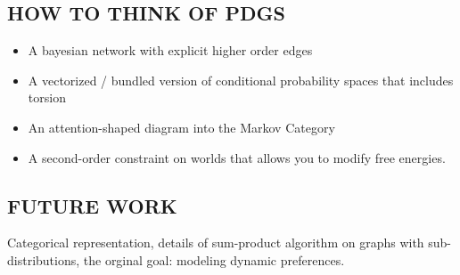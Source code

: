 \documentclass{article}
\numberwithin{equation}{section}
\begin{document}
	
	\begin{vfull}
	\subsection{HOW TO THINK OF PDGS}
	\begin{itemize}
		\item A bayesian network with explicit higher order edges
		\item A vectorized / bundled version of conditional probability spaces that includes torsion
		\item An attention-shaped diagram into the Markov Category
		\item A second-order constraint on worlds that allows you to modify free energies.
	\end{itemize}
	\end{vfull}

	\subsection{FUTURE WORK}
	 Categorical representation, details of sum-product algorithm on graphs with sub-distributions, the orginal goal: modeling dynamic preferences.
\end{document}
